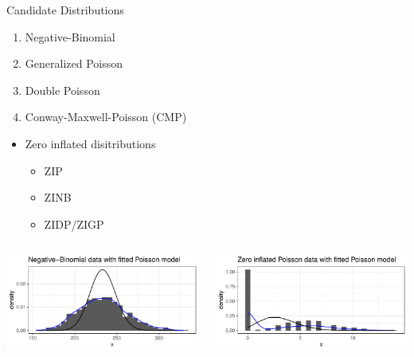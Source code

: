 \documentclass[
  ignorenonframetext,
]{beamer}
\providecommand{\tightlist}{%
  \setlength{\itemsep}{0pt}\setlength{\parskip}{0pt}}\usepackage{longtable,booktabs,array}
\begin{document}
\begin{frame}{Candidate Distributions}
\label{candidate-distributions}
\begin{enumerate}
\tightlist
\item
  Negative-Binomial
\item
  Generalized Poisson
\item
  Double Poisson
\item
  Conway-Maxwell-Poisson (CMP)
\end{enumerate}

\begin{itemize}
\tightlist
\item
  Zero inflated disitributions

  \begin{itemize}
  \tightlist
  \item
    ZIP
  \item
    ZINB
  \item
    ZIDP/ZIGP
  \end{itemize}
\end{itemize}

\begin{columns}[T]
\begin{column}{0.5\textwidth}
\includegraphics{cmp_pres_files/figure-beamer/unnamed-chunk-2-1.pdf}
\end{column}

\begin{column}{0.5\textwidth}
\includegraphics{cmp_pres_files/figure-beamer/unnamed-chunk-3-1.pdf}
\end{column}
\end{columns}
\end{frame}
\end{document}
